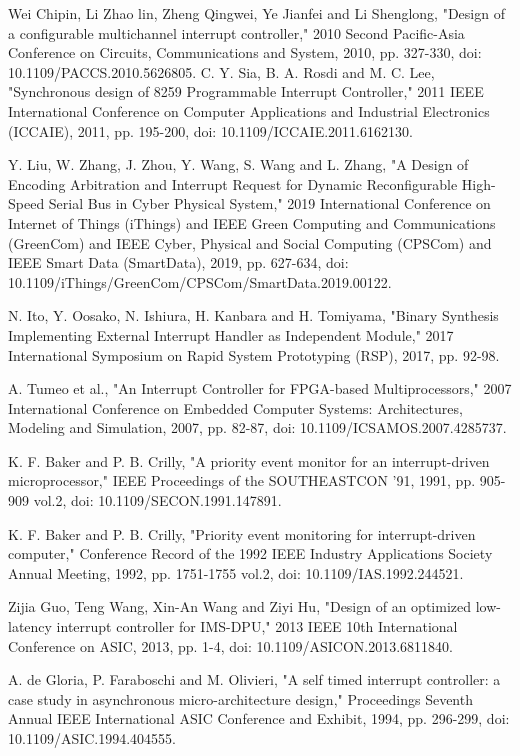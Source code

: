 \documentclass[a4paper, 11pt, oneside]{uet_thesis}  %
\begin{document}
	\begin{thebibliography}{00}
	 Wei Chipin, Li Zhao lin, Zheng Qingwei, Ye Jianfei and Li Shenglong, "Design of a configurable multichannel interrupt controller," 2010 Second Pacific-Asia Conference on Circuits, Communications and System, 2010, pp. 327-330, doi: 10.1109/PACCS.2010.5626805.
	 C. Y. Sia, B. A. Rosdi and M. C. Lee, "Synchronous design of 8259 Programmable Interrupt Controller," 2011 IEEE International Conference on Computer Applications and Industrial Electronics (ICCAIE), 2011, pp. 195-200, doi: 10.1109/ICCAIE.2011.6162130.

	 Y. Liu, W. Zhang, J. Zhou, Y. Wang, S. Wang and L. Zhang, "A Design of Encoding Arbitration and Interrupt Request for Dynamic Reconfigurable High-Speed Serial Bus in Cyber Physical System," 2019 International Conference on Internet of Things (iThings) and IEEE Green Computing and Communications (GreenCom) and IEEE Cyber, Physical and Social Computing (CPSCom) and IEEE Smart Data (SmartData), 2019, pp. 627-634, doi: 10.1109/iThings/GreenCom/CPSCom/SmartData.2019.00122.

	 N. Ito, Y. Oosako, N. Ishiura, H. Kanbara and H. Tomiyama, "Binary Synthesis Implementing External Interrupt Handler as Independent Module," 2017 International Symposium on Rapid System Prototyping (RSP), 2017, pp. 92-98.

	 A. Tumeo et al., "An Interrupt Controller for FPGA-based Multiprocessors," 2007 International Conference on Embedded Computer Systems: Architectures, Modeling and Simulation, 2007, pp. 82-87, doi: 10.1109/ICSAMOS.2007.4285737.

	K. F. Baker and P. B. Crilly, "A priority event monitor for an interrupt-driven microprocessor," IEEE Proceedings of the SOUTHEASTCON '91, 1991, pp. 905-909 vol.2, doi: 10.1109/SECON.1991.147891.

	 K. F. Baker and P. B. Crilly, "Priority event monitoring for interrupt-driven computer," Conference Record of the 1992 IEEE Industry Applications Society Annual Meeting, 1992, pp. 1751-1755 vol.2, doi: 10.1109/IAS.1992.244521.

	 Zijia Guo, Teng Wang, Xin-An Wang and Ziyi Hu, "Design of an optimized low-latency interrupt controller for IMS-DPU," 2013 IEEE 10th International Conference on ASIC, 2013, pp. 1-4, doi: 10.1109/ASICON.2013.6811840.

	A. de Gloria, P. Faraboschi and M. Olivieri, "A self timed interrupt controller: a case study in asynchronous micro-architecture design," Proceedings Seventh Annual IEEE International ASIC Conference and Exhibit, 1994, pp. 296-299, doi: 10.1109/ASIC.1994.404555.


\end{thebibliography}
\end{document}
